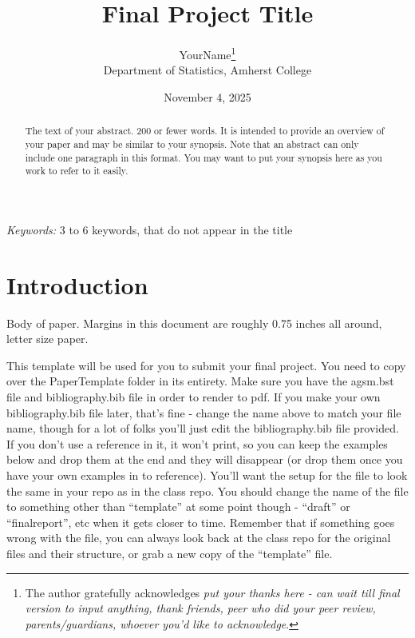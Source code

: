 \documentclass[
  12pt]{article}
\begin{document}
\def\spacingset#1{\renewcommand{\baselinestretch}%
{#1}\small\normalsize} \spacingset{1}



\date{November 4, 2025}
\title{\bf Final Project Title}
\author{
YourName\thanks{The author gratefully acknowledges \emph{put your thanks
here - can wait till final version to input anything, thank friends,
peer who did your peer review, parents/guardians, whoever you'd like to
acknowledge}.}\\
Department of Statistics, Amherst College\\
}
\maketitle

\bigskip
\bigskip
\begin{abstract}
The text of your abstract. 200 or fewer words. It is intended to provide
an overview of your paper and may be similar to your synopsis. Note that
an abstract can only include one paragraph in this format. You may want
to put your synopsis here as you work to refer to it easily.
\end{abstract}

\noindent%
{\it Keywords:} 3 to 6 keywords, that do not appear in the title
\vfill

\newpage
\spacingset{1.9} %


\section{Introduction}\label{sec-intro}

Body of paper. Margins in this document are roughly 0.75 inches all
around, letter size paper.

This template will be used for you to submit your final project. You
need to copy over the PaperTemplate folder in its entirety. Make sure
you have the agsm.bst file and bibliography.bib file in order to render
to pdf. If you make your own bibliography.bib file later, that's fine -
change the name above to match your file name, though for a lot of folks
you'll just edit the bibliography.bib file provided. If you don't use a
reference in it, it won't print, so you can keep the examples below and
drop them at the end and they will disappear (or drop them once you have
your own examples in to reference). You'll want the setup for the file
to look the same in your repo as in the class repo. You should change
the name of the file to something other than ``template'' at some point
though - ``draft'' or ``finalreport'', etc when it gets closer to time.
Remember that if something goes wrong with the file, you can always look
back at the class repo for the original files and their structure, or
grab a new copy of the ``template'' file.
\end{document}
